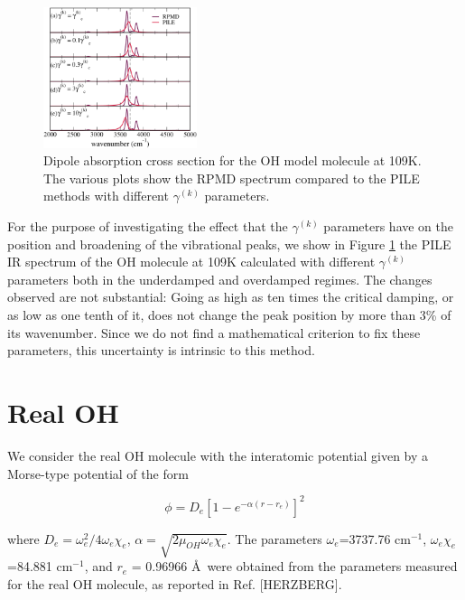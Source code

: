 \documentclass[aps,prb,superscriptaddress,amsmath,amssymb,showpacs,twocolumn]{revtex4}
\begin{document}
\begin{figure}[htbp]
\centering
\includegraphics[width=0.4\textwidth]{figures/oh_rpmdvspiledampings_109K.pdf}
\caption{Dipole absorption cross section for the OH model molecule at 109K. The various plots show the RPMD spectrum compared to the PILE methods with different $\gamma^{(k)}$ parameters.}
\label{fig:oh-rpmd-pile-dampings}
\end{figure}

For the purpose of investigating the effect that the $\gamma^{(k)}$ parameters
have on the position and broadening of the vibrational peaks, we show in
Figure \ref{fig:oh-rpmd-pile-dampings} the
PILE IR spectrum of the OH molecule at 109K calculated with different
$\gamma^{(k)}$ parameters both in the underdamped and overdamped regimes. 
The changes observed are not substantial: Going as high as ten times the critical damping, or as low
as one tenth of it, does not change the peak position by more than 3\% of its wavenumber. Since we do not
find a mathematical criterion to fix these parameters, this uncertainty is  intrinsic to this method.



\section{Real OH}

We consider the real OH molecule with the interatomic potential given by a Morse-type potential of the form

\begin{equation}
\phi = D_{e} \left[ 1-e^{-\alpha(r-r_{e})}\right]^2 
\end{equation}

\noindent where $D_{e} = \omega_e^2/4\omega_e\chi_e$, $\alpha=\sqrt{2\mu_{OH}\omega_e\chi_e}$. The parameters $\omega_e$=3737.76 cm$^{-1}$, $\omega_e \chi_e$=84.881 cm$^{-1}$, and $r_{e}$ = 0.96966 \AA\, were obtained from the parameters measured for the real OH molecule, as reported in Ref. [HERZBERG].
\end{document}
